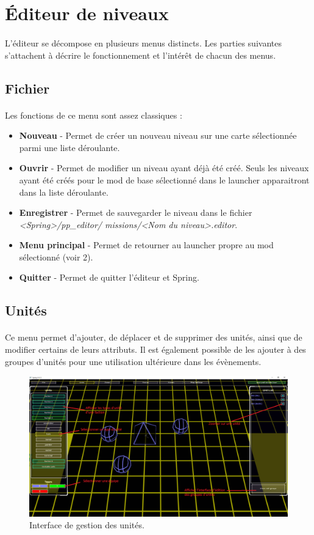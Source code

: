 \documentclass[a4paper]{article}
\begin{document}
\section{Éditeur de niveaux}
\paragraph{ }
L'éditeur se décompose en plusieurs menus distincts. Les parties suivantes s'attachent à décrire le fonctionnement et l'intérêt de chacun des menus.
\subsection{Fichier}
\paragraph{ }
Les fonctions de ce menu sont assez classiques :
\begin{itemize}
\item \textbf{Nouveau} - Permet de créer un nouveau niveau sur une carte sélectionnée parmi une liste déroulante.
\item \textbf{Ouvrir} - Permet de modifier un niveau ayant déjà été créé. Seuls les niveaux ayant été créés pour le mod de base sélectionné dans le launcher apparaitront dans la liste déroulante.
\item \textbf{Enregistrer} - Permet de sauvegarder le niveau dans le fichier \textit{<Spring>/pp\_editor/ missions/<Nom du niveau>.editor}.
\item \textbf{Menu principal} - Permet de retourner au launcher propre au mod sélectionné (voir 2).
\item \textbf{Quitter} - Permet de quitter l'éditeur et Spring.
\end{itemize}
\subsection{Unités}
\paragraph{ }
Ce menu permet d'ajouter, de déplacer et de supprimer des unités, ainsi que de modifier certains de leurs attributs. Il est également possible de les ajouter à des groupes d'unités pour une utilisation ultérieure dans les évènements.
\begin{figure}[H]
\centering
\includegraphics[width=\linewidth]{editor-units.png}
\caption{Interface de gestion des unités.}
\label{fig:editor-units}
\end{figure}
\end{document}
